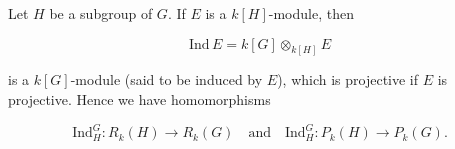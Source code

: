 Let $H$ be a subgroup of $G$. If $E$ is a $k[H]$-module, then

$$\text{Ind}\,E = k[G] \otimes_{k[H]} E$$

is a $k[G]$-module (said to be induced by $E$), which is projective if $E$ is projective. Hence we have homomorphisms

$$\text{Ind}_H^G: R_k(H) \rightarrow R_k(G) \quad \text{and} \quad \text{Ind}_H^G: P_k(H) \rightarrow P_k(G).$$
